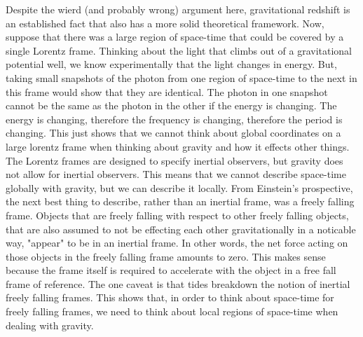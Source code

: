 \hskip 25pt Despite the wierd (and probably wrong) argument here, gravitational redshift is an established fact that also has
a more solid theoretical framework.  Now, suppose that there was a large region of space-time that could be covered by a
single Lorentz frame.  Thinking about the light that climbs out of a gravitational potential well, we know experimentally
that the light changes in energy.  But, taking small snapshots of the photon from one region of space-time to the next in this
frame would show that they are identical.  The photon in one snapshot cannot be the same as the photon in the other if the
energy is changing.  The energy is changing, therefore the frequency is changing, therefore the period is changing.  This just
shows that we cannot think about global coordinates on a large lorentz frame when thinking about gravity and how it effects
other things.  The Lorentz frames are designed to specify inertial observers, but gravity does not allow for
inertial observers.  This means that we cannot describe space-time globally with gravity, but we can describe it
locally.  From Einstein's prospective, the next best thing to describe, rather than an inertial frame, was a freely
falling frame.  Objects that are freely falling with respect to other freely falling objects, that are also assumed to not
be effecting each other gravitationally in a noticable way, "appear" to be in an inertial frame.  In other words, the
net force acting on those objects in the freely falling frame amounts to zero.  This makes sense because the frame itself
is required to accelerate with the object in a free fall frame of reference.  The one caveat is that tides breakdown
the notion of inertial freely falling frames.  This shows that, in order to think about space-time for freely falling
frames, we need to think about local regions of space-time when dealing with gravity.


